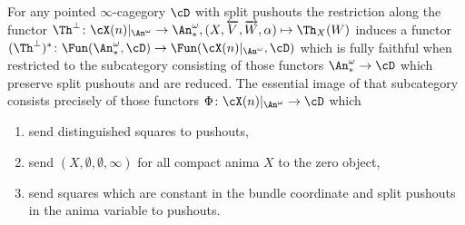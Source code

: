 \begin{proposition}\label{prop:dream2}
    For any pointed $\infty$-cagegory $\cD$
    with split pushouts the restriction along the functor
    $\Th^\perp \colon \cX(n)|_{\An^\omega} \to \An_*^\omega, (X,\overleftarrow{V},\overrightarrow{W}, \alpha) \mapsto \Th_X(W)$
    induces a functor
    $ (\Th^\perp)^* \colon \Fun(\An_*^\omega, \cD) \to \Fun(\cX(n)|_{\An^\omega} , \cD)$
    which is fully faithful when restricted to the subcategory consisting of those
    functors $\An_*^\omega \to \cD$ which preserve split pushouts and are reduced.
    The essential image of that subcategory consists precisely of those functors
    $\Phi \colon \cX(n)|_{\An^\omega}  \to \cD$ which
    \begin{enumerate}
      \item send distinguished squares to pushouts,
      \item send $(X,\emptyset,\emptyset, \infty)$ for all compact anima $X$ to the zero object,
      \item send squares which are constant in the bundle coordinate and split pushouts in the anima variable to pushouts.
    \end{enumerate}
\end{proposition}

